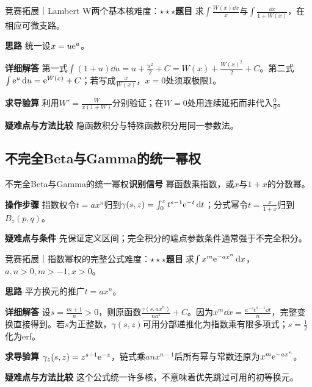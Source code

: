 \begin{example}{竞赛拓展｜Lambert W两个基本核}{难度：$\star\star\star$}\label{ic:ex:indefinite_special_complete:lambertpair}\textbf{题目} 求$\int \frac{W(x)\dd x}{x}$与$\int\frac{\dd x}{1+W(x)}$，在相应可微支路。\par \textbf{思路} 统一设$x=u\mathrm{e}^u$。\par \textbf{详细解答} 第一式$\int(1+u)\dd u=u+\frac{u^2}{2}+C=W(x)+\frac{W(x)^2}{2}+C$。第二式$\int\mathrm{e}^u\mathop{}\!\mathrm{d} u=\mathrm{e}^{W(x)}+C$；若写成$\frac{x}{W(x)}$，$x=0$处须取极限1。\par \textbf{求导验算} 利用$W'=\frac{W}{x(1+W)}$分别验证；在$W=0$处用连续延拓而非代入$\frac{0}{0}$。\par \textbf{疑难点与方法比较} 隐函数积分与特殊函数积分用同一参数法。\end{example}

\subsection{不完全Beta与Gamma的统一幂权}\label{ic:indefinite_special_complete:incomplete}\begin{method}{不完全Beta与Gamma的统一幂权}\textbf{识别信号} 幂函数乘指数，或$x$与$1+x$的分数幂。\par \textbf{操作步骤} 指数权令$t=ax^n$归到$\gamma(s,z)=\int_0^zt^{s-1}\mathrm{e}^{-t}\mathop{}\!\mathrm{d} t$；分式幂令$t=\frac{x}{1+x}$归到$B_z(p,q)$。\par \textbf{疑难点与条件} 先保证定义区间；完全积分的端点参数条件通常强于不完全积分。\end{method}

\begin{example}{竞赛拓展｜指数幂权的完整公式}{难度：$\star\star\star$}\label{ic:ex:indefinite_special_complete:incompletegamma}\textbf{题目} 求$\int x^m\mathrm{e}^{-ax^n}\mathop{}\!\mathrm{d} x$，$a,n>0,m>-1,x>0$。\par \textbf{思路} 平方换元的推广$t=ax^n$。\par \textbf{详细解答} 设$s=\frac{m+1}{n}>0$，则原函数$\frac{\gamma(s,ax^n)}{n a^s}+C$。因为$x^m\dd x=\frac{a^{-s}t^{s-1}\dd t}{n}$，完整变换直接得到。若$s$为正整数，$\gamma(s,z)$可用分部递推化为指数乘有限多项式；$s=\frac{1}{2}$化为erf。\par \textbf{求导验算} $\gamma_z(s,z)=z^{s-1}\mathrm{e}^{-z}$，链式乘$anx^{n-1}$后所有幂与常数还原为$x^m\mathrm{e}^{-ax^n}$。\par \textbf{疑难点与方法比较} 这个公式统一许多核，不意味着优先跳过可用的初等换元。\end{example}

